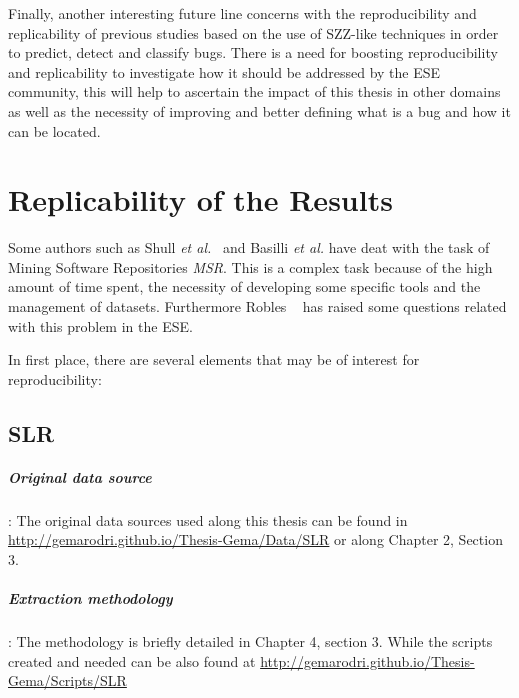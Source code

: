 \documentclass[a4paper, 12pt]{book}
\begin{document}
Finally, another interesting future line concerns with the reproducibility and replicability of previous studies based on the use of SZZ-like techniques in order to predict, detect and classify bugs. There is a need for boosting reproducibility and replicability to investigate how it should be addressed by the ESE community, this will help to ascertain the impact of this thesis in other domains as well as the necessity of improving and better defining what is a bug and how it can be located.


\cleardoublepage
\appendix
\chapter{Replicability of the Results}
\label{app:replicability}

Some authors such as Shull \emph{et al.}~\cite{shull2008role} and Basilli \emph{et al.} \cite{basili1999building} have deat with the task of Mining Software Repositories \emph{MSR}.  This is a complex task because of the high amount of time spent, the necessity of developing some specific tools and the management of datasets. Furthermore Robles ~\cite{robles2010replicating} has raised some questions related with this problem in the ESE.

In first place, there are several elements that may be of interest for reproducibility:

\section{SLR}
\label{sec:replicabilitySLR}
\paragraph{Original data source}: The original data sources used along this thesis can be found in \url{http://gemarodri.github.io/Thesis-Gema/Data/SLR} or along Chapter 2, Section 3.
\paragraph{Extraction methodology}: The methodology is briefly detailed in Chapter 4, section 3. While the scripts created and needed can be also found at \url{http://gemarodri.github.io/Thesis-Gema/Scripts/SLR}
\end{document}
